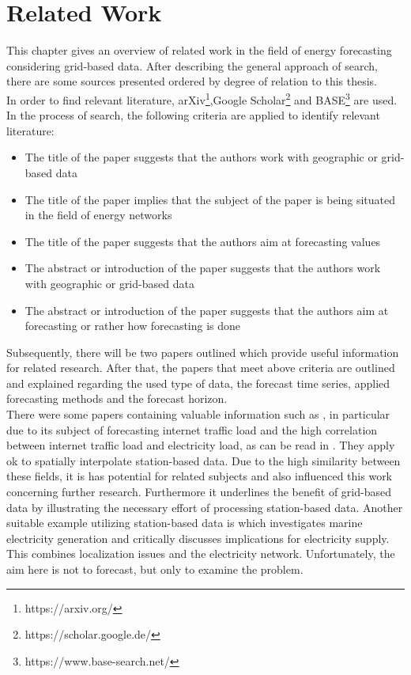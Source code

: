 \chapter{Related Work}
\label{ch:RW}

This chapter gives an overview of related work in the field of energy forecasting considering grid-based data. After describing the general approach of search, there are some sources presented ordered by degree of relation to this thesis.\\

In order to find relevant literature, arXiv\footnote{https://arxiv.org/},Google Scholar\footnote{https://scholar.google.de/} and BASE\footnote{https://www.base-search.net/} are used.\\
In the process of search, the following criteria are applied to identify relevant literature:
\begin{itemize}
  \item The title of the paper suggests that the authors work with geographic or grid-based data
  \item The title of the paper implies that the subject of the paper is being situated in the field of energy networks
  \item The title of the paper suggests that the authors aim at forecasting values
  \item The abstract or introduction of the paper suggests that the authors work with geographic or grid-based data
  \item The abstract or introduction of the paper suggests that the authors aim at forecasting or rather how forecasting is done
\end{itemize}

Subsequently, there will be two papers outlined which provide useful information for related research. After that, the papers that meet above criteria are outlined and explained regarding the used type of data, the forecast time series, applied forecasting methods and the forecast horizon.\\

There were some papers containing valuable information such as , in particular due to its subject of forecasting internet traffic load and the high correlation between internet traffic load and electricity load, as can be read in . They apply \gls{ok} to spatially interpolate station-based data. Due to the high similarity between these fields, it is has potential for related subjects and also influenced this work \eg concerning further research. Furthermore it underlines the benefit of grid-based data by illustrating the necessary effort of processing station-based data. Another suitable example utilizing station-based data is  which investigates marine electricity generation and critically discusses implications for electricity supply. This combines localization issues and the electricity network. Unfortunately, the aim here is not to forecast, but only to examine the problem.\\

